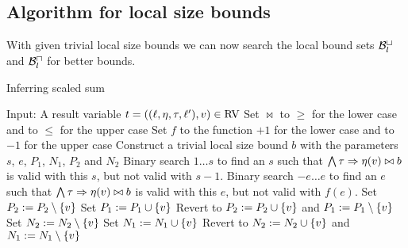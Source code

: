\subsection{Algorithm for local size bounds}

With given trivial local size bounds we can now search the local bound sets $\mathcal{B}^\sqcup_l$ and $\mathcal{B}^\sqcap_l$ for better bounds.

\begin{algorithm}
\caption{Inferring scaled sum}\label{ulsb_algorithm}
\begin{algorithmic}[1]
  \State Input: A result variable $t = ((\ell,\eta,\tau,\ell'),v) \in \text{RV}$
  \State Set $\bowtie$ to $\geq$ for the lower case and to $\leq$ for the upper case
  \State Set $f$ to the function $+1$ for the lower case and to $-1$ for the upper case
  \State Construct a trivial local size bound $b$ with the parameters $s$, $e$, $P_1$, $N_1$, $P_2$ and $N_2$
  \State Binary search $1 \dots s$ to find an $s$ such that $\bigwedge \tau \Rightarrow \eta(v) \bowtie b$ is valid with this $s$, but not valid with $s-1$.
  \State Binary search $-e \dots e$ to find an $e$ such that $\bigwedge \tau \Rightarrow \eta(v) \bowtie b$ is valid with this $e$, but not valid with $f(e)$.
    \State Set $P_2 := P_2 \setminus \lbrace v \rbrace$
      \State Set $P_1 := P_1 \cup \lbrace v \rbrace$
        \State Revert to $P_2 := P_2 \cup \lbrace v \rbrace$ and $P_1 := P_1 \setminus \lbrace v \rbrace$
      \EndIf
    \EndIf
    \State Set $N_2 := N_2 \setminus \lbrace v \rbrace$
      \State Set $N_1 := N_1 \cup \lbrace v \rbrace$
        \State Revert to $N_2 := N_2 \cup \lbrace v \rbrace$ and $N_1 := N_1 \setminus \lbrace v \rbrace$
      \EndIf
    \EndIf
  \EndFor
\end{algorithmic}
\end{algorithm}

